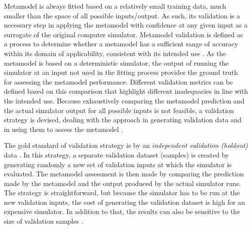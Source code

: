 Metamodel is always fitted based on a relatively small training data, much smaller than the space of all possible inputs/output.
As such, its validation is a necessary step in applying the metamodel with confidence at any given input as a surrogate of the original computer simulator.
Metamodel validation is defined as a process to determine whether a metamodel has a sufficient range of accuracy within its domain of applicability, consistent with its intended use \cite{Kleijnen2000}.
As the metamodel is based on a deterministic simulator, 
the output of running the simulator at an input not used in the fitting process provides the ground truth for assessing the metamodel performance.
Different validation metrics can be defined based on this comparison that highlight different inadequacies in line with the intended use.
Because exhaustively comparing the metamodel prediction and the actual simulator output for all possible inputs is not feasible,
a validation strategy is devised, 
dealing with the approach in generating validation data and in using them to assess the metamodel \cite{Meckesheimer2002}.

The gold standard of validation strategy is by an \emph{independent validation (holdout)} data \cite{Chen2016}.
In this strategy, a separate validation dataset (samples) is created by generating randomly a new set of validation inputs at which the simulator is evaluated.  
The metamodel assessment is then made by comparing the prediction made by the metamodel and the output produced by the actual simulator runs.
The strategy is straightforward, but because the simulator has to be run at the new validation inputs, the cost of generating the validation dataset is high for an expensive simulator.
In addition to that, the results can also be sensitive to the size of validation samples \cite{Hamad2011}.

